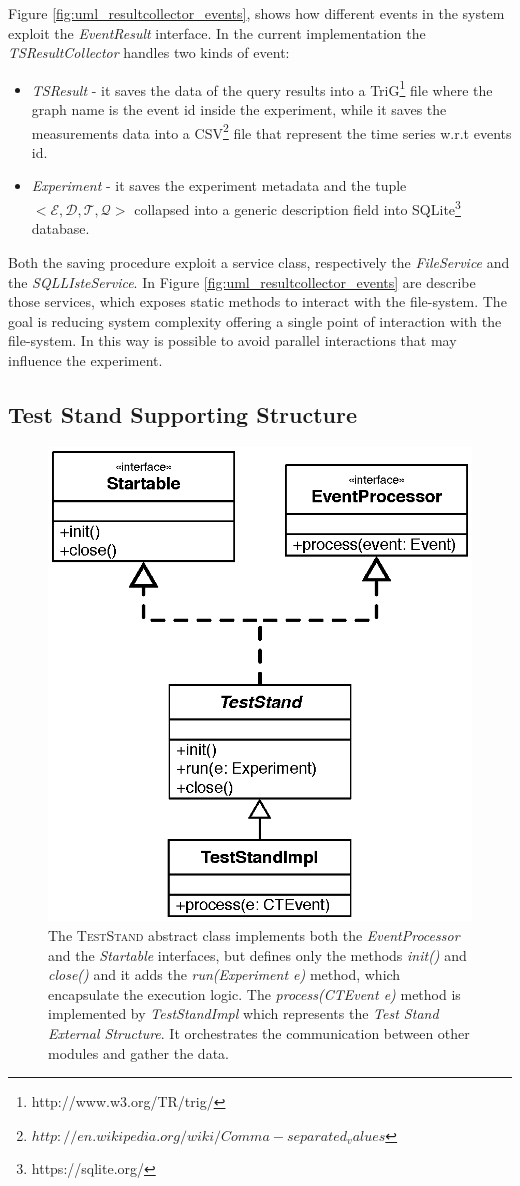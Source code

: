 Figure \ref{fig:uml_resultcollector_events}, shows how different events in the system exploit the \textit{EventResult} interface. In the current implementation the \textit{TSResultCollector} handles two kinds of event:
\begin{itemize}
\item \textit{TSResult} - it saves the data of the query results into a TriG\footnote{http://www.w3.org/TR/trig/} file where the graph name is the event id inside the experiment, while it saves the measurements data into a CSV\footnote{$http://en.wikipedia.org/wiki/Comma-separated_values$} file that represent the time series w.r.t events id. 
\item \textit{Experiment} - it saves the experiment metadata and the tuple \\ $<\mathcal{E},\mathcal{D},\mathcal{T},\mathcal{Q}>$ collapsed into a generic description field into SQLite\footnote{https://sqlite.org/} database.
\end{itemize} 

Both the saving procedure exploit a service class, respectively the \textit{FileService} and the \textit{SQLLIsteService}. In Figure \ref{fig:uml_resultcollector_events} are describe those services, which exposes static methods to interact with the file-system. The goal is reducing system complexity offering a single point of interaction with the file-system. In this way is possible  to avoid parallel interactions that may influence the experiment. 


\subsection{Test Stand Supporting Structure}\label{sec:teststand-impl}


\begin{figure}[tbh]
  \centering
	\includegraphics[width=0.5\linewidth]{images/uml_teststand}
	\caption[UML Schema: \name \textsc{TestStand}]{The \textsc{TestStand} abstract class implements both the \textit{EventProcessor} and the \textit{Startable} interfaces, but defines only the methods \textit{init()} and \textit{close()}  and it adds the \textit{run(Experiment e)} method, which encapsulate the execution logic. The \textit{process(CTEvent e)} method is implemented by \textit{TestStandImpl} which represents the \textit{Test Stand External Structure}. It orchestrates the communication between other modules and gather the data.}
  	\label{fig:uml_teststand}
\end{figure}


